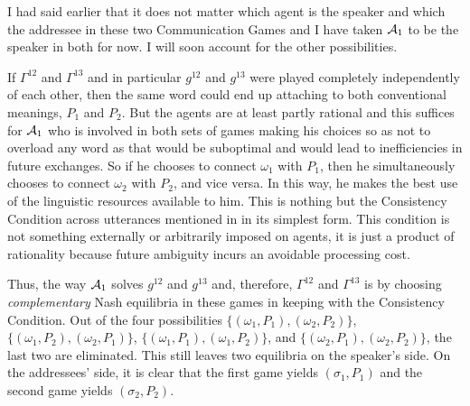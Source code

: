 
I had said earlier that it does not matter which agent is the speaker and which the addressee in these two Communication Games and I have taken ${\cal A}_1$ to be the speaker in both for now. I will soon account for the other possibilities.

If $\Gamma^{12}$ and $\Gamma^{13}$ and in particular $g^{12}$ and $g^{13}$ were played completely independently of each other, then the same word could end up attaching to both conventional meanings, $P_1$ and $P_2$. But the agents are at least partly rational and this suffices for ${\cal A}_1$ who is involved in both sets of games making his choices so as not to overload any word as that would be suboptimal and would lead to inefficiencies in future exchanges. So if he chooses to connect $\omega_1$ with $P_1$, then he simultaneously chooses to connect $\omega_2$ with $P_2$, and vice versa. In this way, he makes the best use of the linguistic resources available to him. This is nothing but the Consistency Condition across utterances mentioned in  in its simplest form. This condition is not something externally or arbitrarily imposed on agents, it is just a product of rationality because future ambiguity incurs an avoidable processing cost.

Thus, the way ${\cal A}_1$ solves $g^{12}$ and $g^{13}$ and, therefore, $\Gamma^{12}$ and $\Gamma^{13}$ is by choosing \emph{complementary} Nash equilibria in these games in keeping with the Consistency Condition. Out of the four possibilities $\{(\omega_1,P_1), (\omega_2,P_2)\}$, $\{(\omega_1,P_2), (\omega_2,P_1)\}$, $\{(\omega_1,P_1), (\omega_1,P_2)\}$, and $\{(\omega_2,P_1), (\omega_2,P_2)\}$, the last two are eliminated. This still leaves two equilibria on the speaker's side. On the addressees' side, it is clear that the first game yields $(\sigma_1,P_1)$ and the second game yields $(\sigma_2,P_2)$.

